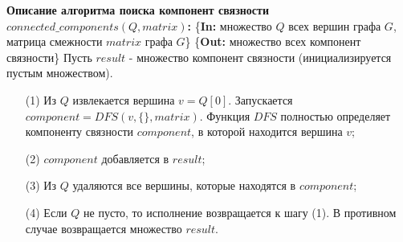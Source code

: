 \documentclass[a4paper,20pt]{article}
\numberwithin{equation}{subsubsection}
\numberwithin{definition}{subsubsection}
\begin{document}
	\noindent\textbf{Описание алгоритма поиска компонент связности $connected\_components(Q, matrix)$:}
	\newline
	\{\textbf{In:} множество $Q$ всех вершин графа $G$, матрица смежности $matrix$ графа $G$\}
	\newline
	\{\textbf{Out:} множество всех компонент связности\}
	\newline
	Пусть $result$ - множество компонент связности (инициализируется пустым множеством).
	\begin{enumerate}
		\item[(1)] Из $Q$ извлекается вершина $v = Q[0]$. Запускается $component = DFS(v, \{\}, matrix)$. Функция $DFS$ полностью определяет компоненту связности $component$, в которой находится вершина $v$;
		\item[(2)] $component$ добавляется в $result$;
		\item[(3)] Из $Q$ удаляются все вершины, которые находятся в $component$;
		\item[(4)] Если $Q$ не пусто, то исполнение возвращается к шагу (1). В противном случае возвращается множество $result$.
	\end{enumerate}
	
\end{document}
